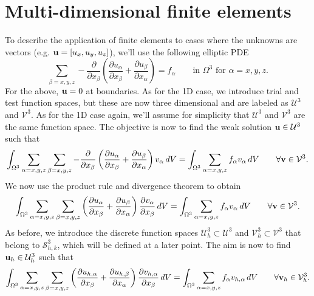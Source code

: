 \documentclass[oneside,a4paper,11pt]{report}
\begin{document}
\section{Multi-dimensional finite elements}
To describe the application of finite elements to cases where the unknowns are vectors (e.g. $\mathbf{u} = [u_x,u_y,u_z]$), we'll use the following elliptic PDE
\begin{equation}
    \label{eq:fe_elliptic_pde_vector}
    \sum_{\beta=x,y,z} -\frac{\partial}{\partial x_\beta} \left ( \frac{\partial u_\alpha}{\partial x_\beta} + \frac{\partial u_\beta}{\partial x_\alpha} \right ) = f_\alpha \qquad \text{in } \Omega^3 \text{ for } \alpha = x,y,z.
\end{equation}
For the above, $\mathbf{u} = 0$ at boundaries. As for the 1D case, we introduce trial and test function spaces, but these are now three dimensional and are labeled as $\mathcal{U}^3$ and $\mathcal{V}^3$. As for the 1D case again, we'll assume for simplicity that $\mathcal{U}^3$ and $\mathcal{V}^3$ are the same function space. The objective is now to find the weak solution $\mathbf{u} \in \mathcal{U}^3$ such that
\begin{equation}
    \int_{\Omega^3} \sum_{\alpha=x,y,z} \sum_{\beta=x,y,z} -\frac{\partial}{\partial x_\beta} \left ( \frac{\partial u_\alpha}{\partial x_\beta} + \frac{\partial u_\beta}{\partial x_\alpha} \right ) v_\alpha \, dV = \int_{\Omega^3} \sum_{\alpha=x,y,z} f_\alpha v_\alpha \,dV \qquad \forall \mathbf{v} \in \mathcal{V}^3.
\end{equation}
We now use the product rule and divergence theorem to obtain
\begin{equation}
    \int_{\Omega^3} \sum_{\alpha=x,y,z} \sum_{\beta=x,y,z} \left ( \frac{\partial u_\alpha}{\partial x_\beta} + \frac{\partial u_\beta}{\partial x_\alpha} \right ) \frac{\partial v_\alpha}{\partial x_\beta} \, dV = \int_{\Omega^3} \sum_{\alpha=x,y,z} f_\alpha v_\alpha \,dV \qquad \forall \mathbf{v} \in \mathcal{V}^3.
\end{equation}
As before, we introduce the discrete function spaces $\mathcal{U}_h^3 \subset \mathcal{U}^3$ and $\mathcal{V}^3_h \subset \mathcal{V}^3$ that belong to $\mathcal{S}_{h,k}^3$, which will be defined at a later point. The aim is now to find $\mathbf{u}_h \in \mathcal{U}_h^3$ such that
\begin{equation}
    \int_{\Omega^3} \sum_{\alpha=x,y,z} \sum_{\beta=x,y,z} \left ( \frac{\partial u_{h,\alpha}}{\partial x_\beta} + \frac{\partial u_{h,\beta}}{\partial x_\alpha} \right ) \frac{\partial v_{h,\alpha}}{\partial x_\beta} \, dV = \int_{\Omega^3} \sum_{\alpha=x,y,z} f_\alpha v_{h,\alpha} \,dV \qquad \forall \mathbf{v}_h \in \mathcal{V}_h^3.
\end{equation}
\end{document}
